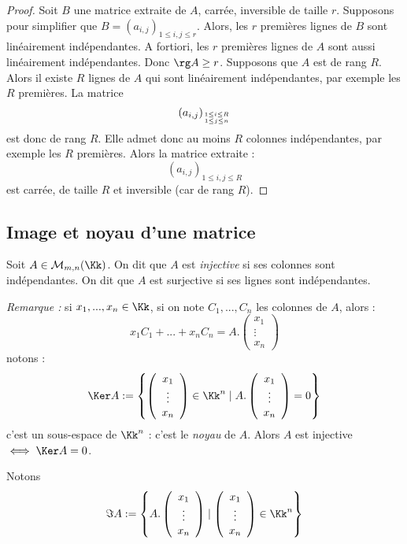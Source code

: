 \documentclass[class=report,crop=false]{standalone}
\begin{document}
\begin{proof}
Soit $B$ une matrice extraite de $A$, carrée, inversible de taille $r$. Supposons pour simplifier que $B= (a_{i,j})_{1\le i,j\le r}$. Alors, les $r$ premières lignes de $B$ sont linéairement indépendantes. A fortiori, les $r$ premières lignes de $A$ sont aussi linéairement indépendantes. Donc $\rg A \ge r $. Supposons que $A$ est de rang $R$. Alors il existe $R$ lignes de $A$ qui sont linéairement indépendantes, par exemple les $R$ premières. La matrice 
\[(a_{i,j})_{1\le i \le R \atop 1 \le j \le n}\]
est donc de rang $R$. Elle admet donc au moins $R$ colonnes indépendantes, par exemple les $R$ premières. Alors la matrice extraite :
\[(a_{i,j})_{1 \le i,j \le R}\]
est carrée, de taille $R$ et inversible (car de rang $R$). 
\end{proof}

\subsection{Image et noyau d'une matrice}

Soit $A \in \mathcal{M}_{m,n}(\Kk)$. On dit que $A$ est {\it injective} si ses colonnes sont indépendantes. On dit que $A$ est surjective si ses lignes sont indépendantes.

{\it Remarque :} si $x_1,...,x_n \in \Kk$, si on note $C_1,...,C_n$ les colonnes de $A$, alors :
\[x_1C_1+...+x_nC_n = A.\left(\begin{array}{c}
x_1\\\vdots\\x_n
\end{array}\right)\]
notons : \[\Ker A:= \left\{{\left(\begin{array}{c}
x_1\\\vdots\\x_n
\end{array}\right) \in \Kk^n \mid A.\left(\begin{array}{c}
x_1\\\vdots\\x_n
\end{array}\right) = 0}\right\} \]
c'est un sous-espace de $\Kk^n$ : c'est le {\it noyau} de $A$.
Alors $A$ est injective $\iff \Ker A =0$.

Notons \[\Im A: = \left\{{ A.\left(\begin{array}{c}
x_1\\\vdots\\x_n
\end{array}\right) \mid \left(\begin{array}{c}
x_1\\\vdots\\x_n
\end{array}\right) \in \Kk^n }\right\}\]
\end{document}
